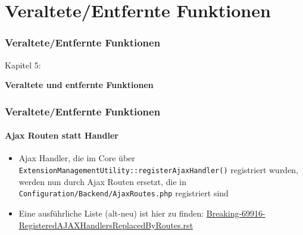 %

\section{Veraltete/Entfernte Funktionen}
\begin{frame}[fragile]
	\frametitle{Veraltete/Entfernte Funktionen}

	\begin{center}\huge{Kapitel 5:}\end{center}
	\begin{center}\huge{\color{typo3darkgrey}\textbf{Veraltete und entfernte Funktionen}}\end{center}

\end{frame}


\begin{frame}[fragile]
	\frametitle{Veraltete/Entfernte Funktionen}
	\framesubtitle{Ajax Routen statt Handler}

	\begin{itemize}

		\item Ajax Handler, die im Core über
			\texttt{ExtensionManagementUtility::registerAjaxHandler()}
			registriert wurden, werden nun durch Ajax Routen ersetzt,
			die in \texttt{ Configuration/Backend/AjaxRoutes.php} registriert sind

		\item Eine ausführliche Liste (alt-neu) ist hier zu finden:\newline
				\href{https://forge.typo3.org/projects/typo3cms-core/repository/revisions/3f0fb6229ba391356e5ed4984eb1c9418ba6663e/entry/typo3/sysext/core/Documentation/Changelog/master/Breaking-69916-RegisteredAJAXHandlersReplacedByRoutes.rst}{Breaking-69916-RegisteredAJAXHandlersReplacedByRoutes.rst}
	\end{itemize}

\end{frame}

